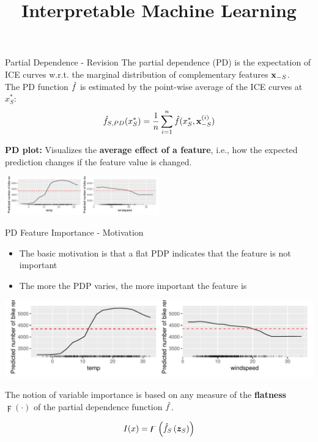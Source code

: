 \documentclass[11pt,compress,t,notes=noshow, aspectratio=169, xcolor=table]{beamer}
\title{Interpretable Machine Learning}
\date{}
\begin{document}
\newcommand{\titlefigure}{figure_man/pdps_bike}
\newcommand{\learninggoals}{
\item Introduction to PDP feature importance
\item Numerical and Categorical Measures of flatness
}


\begin{frame}{Partial Dependence - Revision}
The partial dependence (PD) is the expectation of ICE curves w.r.t. the marginal distribution of complementary features $\mathbf{x}_{-S}$.\\
The PD function $\hat{f}$ is estimated by the point-wise average of the ICE curves at $x_S^*$:
$$\hat{f}_{S, PD}(x_S^*) = \frac{1}{n} \sum_{i=1}^n \hat{f}(x_S^*, \mathbf{x}_{-S}^{(i)})$$



\textbf{PD plot:} Visualizes the \textbf{average effect of a feature},
  i.e., how the expected prediction changes if the feature value is changed.
\begin{center}
\includegraphics[width=0.5\textwidth]{figure_man/pdps_bike}
\end{center}
\end{frame}

\begin{frame}{PD Feature Importance - Motivation}
\begin{itemize}
    \item The basic motivation is that a flat PDP indicates that the feature is not important
    \item The more the PDP varies, the more important the feature is
\end{itemize}

\begin{center}
\includegraphics[width=1\textwidth]{figure_man/pdps_bike}
\end{center}

The notion of variable importance is based on any measure of the \textbf{flatness} $\digamma(\cdot)$ of the partial dependence function $\hat{f}$.

$$
I(x)=\digamma\left(\hat{f}_{S}\left(\boldsymbol{z}_{S}\right)\right)
$$

\end{frame}
\end{document}
